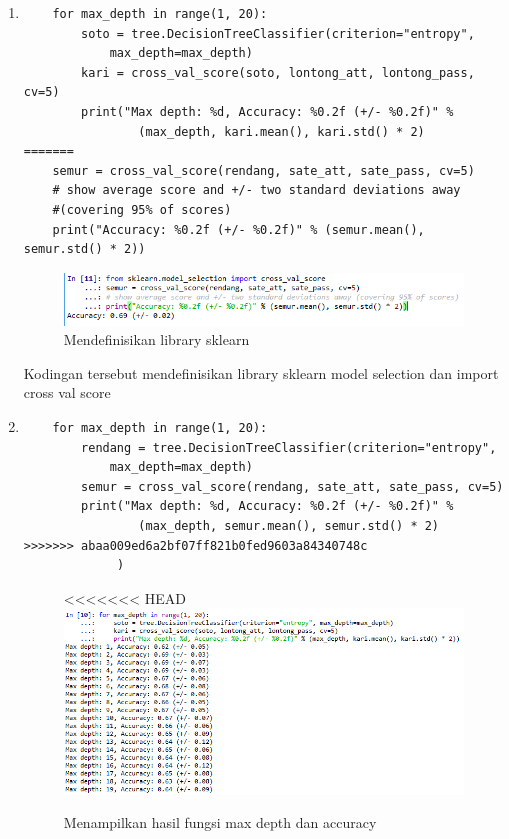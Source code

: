 \begin{enumerate}
\item 
\begin{verbatim}
	for max_depth in range(1, 20):
	    soto = tree.DecisionTreeClassifier(criterion="entropy", 
			max_depth=max_depth)
	    kari = cross_val_score(soto, lontong_att, lontong_pass, cv=5)
	    print("Max depth: %d, Accuracy: %0.2f (+/- %0.2f)" % 
				(max_depth, kari.mean(), kari.std() * 2)
=======
	semur = cross_val_score(rendang, sate_att, sate_pass, cv=5)
	# show average score and +/- two standard deviations away 
	#(covering 95% of scores)
	print("Accuracy: %0.2f (+/- %0.2f)" % (semur.mean(), semur.std() * 2))
\end{verbatim}
\begin{figure}[ht]
\centering
\includegraphics[scale=0.6]{figures/48.png}
\caption{Mendefinisikan library sklearn}
\end{figure}
\par
	Kodingan tersebut mendefinisikan library sklearn model selection dan import cross val score
\item 
\begin{verbatim}
	for max_depth in range(1, 20):
	    rendang = tree.DecisionTreeClassifier(criterion="entropy", 
			max_depth=max_depth)
	    semur = cross_val_score(rendang, sate_att, sate_pass, cv=5)
	    print("Max depth: %d, Accuracy: %0.2f (+/- %0.2f)" % 
				(max_depth, semur.mean(), semur.std() * 2)
>>>>>>> abaa009ed6a2bf07ff821b0fed9603a84340748c
			 )
\end{verbatim}
\begin{figure}[ht]
\centering
<<<<<<< HEAD
\includegraphics[scale=0.6]{figures/lontong/10.png}
\caption{Menampilkan hasil fungsi max depth dan accuracy}
\end{figure}

\end{enumerate}
